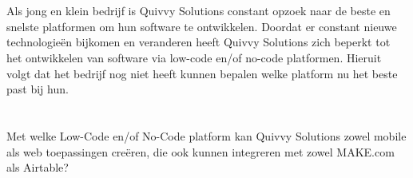 \section{}%
\label{sec:probleemstelling}
Als jong en klein bedrijf is Quivvy Solutions constant opzoek naar de beste en snelste platformen om hun software te ontwikkelen. 
Doordat er constant nieuwe technologieën bijkomen en veranderen heeft Quivvy Solutions zich beperkt tot het ontwikkelen van software 
via low-code en/of no-code platformen. Hieruit volgt dat het bedrijf nog niet heeft kunnen bepalen welke platform nu het beste past bij hun.

\section{}%
\label{sec:onderzoeksvraag}
Met welke Low-Code en/of No-Code platform kan Quivvy Solutions zowel mobile als web toepassingen creëren, die ook kunnen integreren met
zowel MAKE.com als Airtable?

